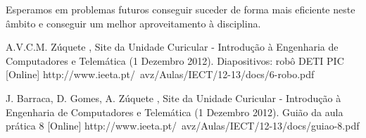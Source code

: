 \documentclass[a4paper, 12pt, onecolumn, oneside]{report}
\begin{document}
Esperamos em problemas futuros conseguir suceder de forma mais eficiente neste âmbito e conseguir um melhor aproveitamento à disciplina. 



\begin{thebibliography}{99} 

A.V.C.M. Zúquete , Site da Unidade Curicular - Introdução à Engenharia de Computadores e Telemática (1 Dezembro 2012).
\newblock Diapositivos: robô DETI PIC [Online]
 http://www.ieeta.pt/~avz/Aulas/IECT/12-13/docs/6-robo.pdf 

J. Barraca, D. Gomes, A. Zúquete , Site da Unidade Curicular - Introdução à  Engenharia de Computadores e Telemática (1 Dezembro 2012).
\newblock Guião da aula prática 8 [Online]
 http://www.ieeta.pt/~avz/Aulas/IECT/12-13/docs/guiao-8.pdf 

 
\end{thebibliography}
\end{document}
